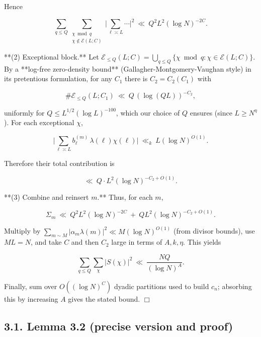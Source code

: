 \documentclass[11pt]{article}
\theoremstyle{definition}
\theoremstyle{remark}
\begin{document}
Hence

$$
	\sum_{q\le Q}\sum_{\substack{\chi\bmod q\\ \chi\notin\mathcal E(L;C)}}
	\Big|\sum_{\ell\asymp L}\cdots\Big|^2\ \ll\ Q^2 L^2 (\log N)^{-2C}.
$$

**(2) Exceptional block.**
Let $\mathcal E_{\le Q}(L;C)=\bigcup_{q\le Q}\{\chi\bmod q:\chi\in\mathcal E(L;C)\}$. By a **log-free zero-density bound** (Gallagher-Montgomery-Vaughan style) in its pretentious formulation, for any $C_1$ there is $C_2=C_2(C_1)$ with

$$
	\#\mathcal E_{\le Q}(L;C_1)\ \ll\ Q\,(\log (QL))^{-C_2},
$$

uniformly for $Q\le L^{1/2}(\log L)^{-100}$, which our choice of $Q$ ensures (since $L\ge N^{\eta}$). For each exceptional $\chi$,

$$
	\Big|\sum_{\ell\asymp L} b^{(m)}_\ell\,\lambda(\ell)\chi(\ell)\Big|
	\ \ll_k\ L(\log N)^{O(1)}.
$$

Therefore their total contribution is

$$
	\ll\ Q\cdot L^2 (\log N)^{-C_2+O(1)}.
$$

**(3) Combine and reinsert $m$.**
Thus, for each $m$,

$$
	\Sigma_m\ \ll\ Q^2 L^2 (\log N)^{-2C} \ +\ Q L^2 (\log N)^{-C_2+O(1)}.
$$

Multiply by $\sum_{m\sim M}|\alpha_m\lambda(m)|^2\ll M(\log N)^{O(1)}$ (from divisor bounds), use $ML=N$, and take $C$ and then $C_2$ large in terms of $A,k,\eta$. This yields

$$
	\sum_{q\le Q}\sum_{\chi}|S(\chi)|^2\ \ll\ \frac{NQ}{(\log N)^A}.
$$

Finally, sum over $O((\log N)^C)$ dyadic partitions used to build $c_n$; absorbing this by increasing $A$ gives the stated bound. $\Box$

\subsection*{3.1. Lemma 3.2 (precise version and proof)}
\end{document}
